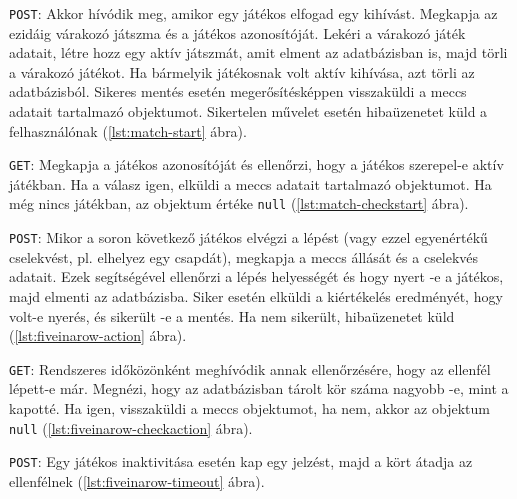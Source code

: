 \texttt{POST}: Akkor hívódik meg, amikor egy játékos elfogad egy kihívást. Megkapja az ezidáig várakozó játszma és a játékos azonosítóját. Lekéri a várakozó játék adatait, létre hozz egy aktív játszmát, amit elment az adatbázisban is, majd törli a várakozó játékot. Ha bármelyik játékosnak volt aktív kihívása, azt törli az adatbázisból.
Sikeres mentés esetén megerősítésképpen visszaküldi a meccs adatait tartalmazó objektumot.
Sikertelen művelet esetén hibaüzenetet küld a felhasználónak (\ref{lst:match-start} ábra).



\texttt{GET}: Megkapja a játékos azonosítóját és ellenőrzi, hogy a játékos szerepel-e aktív játékban. Ha a válasz igen, elküldi a meccs adatait tartalmazó objektumot. Ha még nincs játékban, az objektum értéke \texttt{null} (\ref{lst:match-checkstart} ábra).




\texttt{POST}: Mikor a soron következő játékos elvégzi a lépést (vagy ezzel egyenértékű cselekvést, pl. elhelyez egy csapdát), megkapja a meccs állását és a cselekvés adatait. Ezek segítségével ellenőrzi a lépés helyességét és hogy nyert -e a játékos, majd elmenti az adatbázisba.
Siker esetén elküldi a kiértékelés eredményét, hogy volt-e nyerés, és sikerült -e a mentés. Ha nem sikerült, hibaüzenetet küld (\ref{lst:fiveinarow-action} ábra).



\texttt{GET}: Rendszeres időközönként meghívódik annak ellenőrzésére, hogy az ellenfél lépett-e már. Megnézi, hogy az adatbázisban tárolt kör száma nagyobb -e, mint a kapotté. Ha igen, visszaküldi a meccs objektumot, ha nem, akkor az objektum \texttt{null} (\ref{lst:fiveinarow-checkaction} ábra).



\texttt{POST}: Egy játékos inaktivitása esetén kap egy jelzést, majd a kört átadja az ellenfélnek (\ref{lst:fiveinarow-timeout} ábra).

